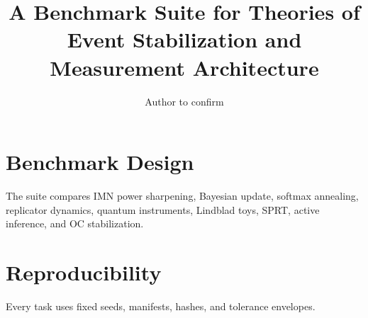 \documentclass{article}
\title{A Benchmark Suite for Theories of Event Stabilization and Measurement Architecture}
\author{Author to confirm}
\begin{document}
\maketitle
\section{Benchmark Design}
The suite compares IMN power sharpening, Bayesian update, softmax annealing, replicator dynamics, quantum instruments, Lindblad toys, SPRT, active inference, and OC stabilization.
\section{Reproducibility}
Every task uses fixed seeds, manifests, hashes, and tolerance envelopes.
\end{document}
